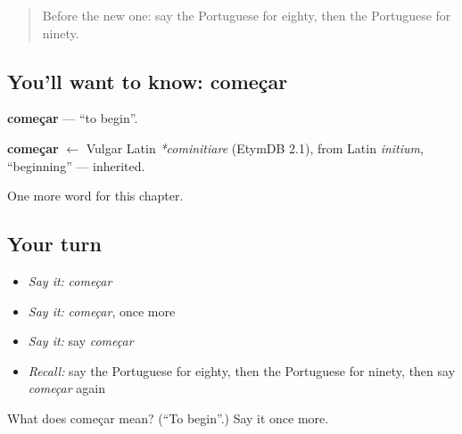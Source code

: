 \begin{quote}
Before the new one: say the Portuguese for eighty, then the Portuguese for ninety.
\end{quote}

\subsection*{You'll want to know: começar}
\textbf{começar} — \textquotedblleft{}to begin\textquotedblright{}.

\begin{cousinweb}
\textbf{começar} $\leftarrow$ Vulgar Latin \emph{*cominitiare} (EtymDB 2.1), from Latin \emph{initium}, \textquotedblleft{}beginning\textquotedblright{} — inherited.
\end{cousinweb}

\begin{grammarlens}[title={What you've built}]
One more word for this chapter.
\end{grammarlens}

\subsection*{Your turn}
\begin{itemize}
\raggedright
  \item \emph{Say it:} \emph{começar}
  \item \emph{Say it:} \emph{começar}, once more
  \item \emph{Say it:} say \emph{começar}
  \item \emph{Recall:} say the Portuguese for eighty, then the Portuguese for ninety, then say \emph{começar} again
\end{itemize}

\begin{tcolorbox}[breakable,colback=teal!4,colframe=teal!35!black,title={Before you move on}]
What does começar mean? (\textquotedblleft{}To begin\textquotedblright{}.) Say it once more.
\end{tcolorbox}
